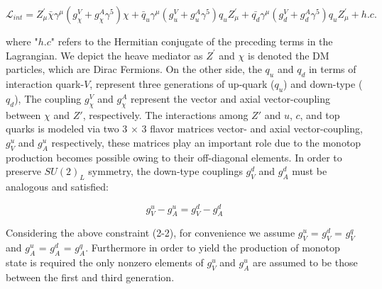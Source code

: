 
\begin{equation}
\mathcal{L}_{int} = Z^{'}_{\mu }\bar{\chi}\gamma^{\mu}(g^{V}_{\chi}+g^{A}_{\chi}\gamma ^{5})\chi + \bar{q}_{u}\gamma^{\mu}(g^{V}_{u}+g^{A}_{u}\gamma^{5})q_{u}Z^{'}_{\mu}+\bar{q_{d}}\gamma^{\mu}(g^{V}_{d}+g^{A}_{d}\gamma ^{5})q_{u}Z^{'}_{\mu} + h.c.
\end{equation}

\noindent where "$h.c$"  refers to the Hermitian conjugate of the preceding terms in the Lagrangian. We depict the heave mediator as $Z^{'}$ and $\chi$ is denoted the DM particles, which are Dirac Fermions. On the other side, the $q_{u}$ and $q_{d}$ in terms of interaction quark-$V$, represent three generations of up-quark ($q_{u}$) and down-type ($q_{d}$),  The coupling $g_{\chi}^{V}$ and $g_{\chi}^{A}$ represent the vector and axial vector-coupling between $\chi$ and $Z'$, respectively. The interactions among $Z'$ and $u$, $c$, and top quarks is modeled via two 3 $\times$ 3 flavor matrices vector- and axial vector-coupling, $g_{V}^{u}$ and $g_{A}^{u}$ respectively, these matrices play an important role due to the monotop production becomes possible owing to their off-diagonal elements. In order to preserve $SU(2)_{L}$ symmetry, the down-type couplings $g_{V}^{d}$ and $g_{A}^{d}$ must be analogous and satisfied:

\begin{equation}
g_{V}^{u}-g_{A}^{u} = g_{V}^{d} - g_{A}^{d}
\end{equation}

Considering the above constraint (2-2), for convenience we assume $g_{V}^{u}$ = $g_{V}^{d}$ =  $g_{V}^{q}$ and $g_{A}^{u}$ = $g_{A}^{d}$ =  $g_{A}^{q}$. Furthermore in order to yield the production of monotop state is required the only nonzero elements of $g_{V}^{u}$ and $g_{A}^{u}$ are assumed to be those between the first and third generation.

